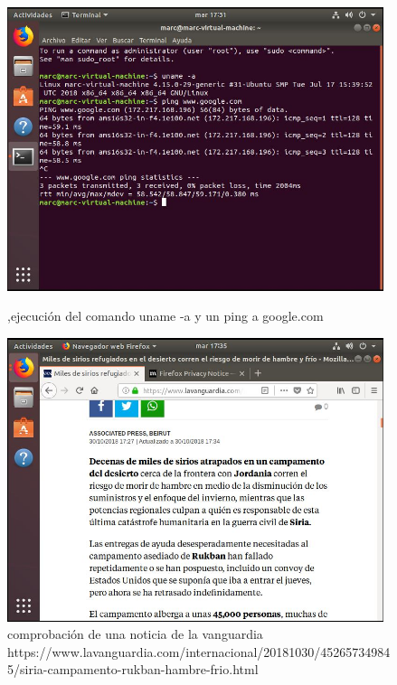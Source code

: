 \documentclass[preprint,11pt]{elsarticle}
\begin{document}
\begin{figure}[!htbp]
    \begin{center}
        \includegraphics[width=11cm]{ubuntu5.JPG}
    \end{center}
    \caption{,ejecución del comando uname -a y un ping a google.com}
    \begin{center}
        \includegraphics[width=11cm]{ubuntu6.JPG}
    \end{center}
    \caption{comprobación de una noticia de la vanguardia \newline https://www.lavanguardia.com/internacional/20181030/452657349845/siria-campamento-rukban-hambre-frio.html}
\end{figure}

\clearpage
\end{document}
